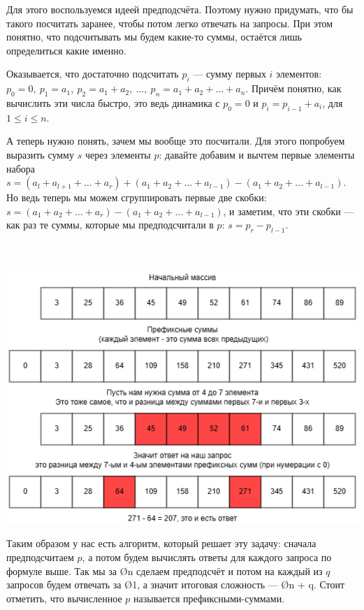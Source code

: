 Для этого воспользуемся идеей предподсчёта. Поэтому нужно придумать, что бы такого посчитать заранее, чтобы потом легко отвечать на запросы. При этом понятно, что подсчитывать мы будем какие-то суммы, остаётся лишь определиться какие именно.\\
\begin{minipage}[c]{0.40\linewidth}
    \setlength{\parindent}{1cm}
    \indent Оказывается, что достаточно подсчитать $p_i$ — сумму первых $i$ элементов: $p_0 = 0,\ p_1 = a_1,\ p_2 = a_1 + a_2,\ \ldots,\ p_n = a_1 + a_2 + \ldots + a_n$. Причём понятно, как вычислить эти числа быстро, это ведь динамика с $p_0 = 0$ и $p_i = p_{i - 1} + a_i$, для $1 \leq i \leq n$.
    
    А теперь нужно понять, зачем мы вообще это посчитали. Для этого попробуем выразить сумму $s$ через элементы $p$: давайте добавим и вычтем первые элементы набора $s = (a_l + a_{l + 1} + \ldots + a_{r}) + (a_1 + a_2 + \ldots + a_{l - 1}) - (a_1 + a_2 + \ldots + a_{l - 1})$. Но ведь теперь мы можем сгруппировать первые две скобки: $s = (a_1 + a_2 + \ldots + a_r) - (a_1 + a_2 + \ldots + a_{l - 1})$, и заметим, что эти скобки — как раз те суммы, которые мы предподсчитали в $p$: $s = p_r - p_{l - 1}$.
\end{minipage}
\begin{minipage}[c]{0.03\linewidth}\ \end{minipage}
\begin{minipage}[c]{0.57\linewidth}
    \includegraphics[scale=0.73]{img/prefix_sum.png}
\end{minipage}

Таким образом у нас есть алгоритм, который решает эту задачу: сначала предподсчитаем $p$, а потом будем вычислять ответы для каждого запроса по формуле выше. Так мы за \O{n} сделаем предподсчёт и потом на каждый из $q$ запросов будем отвечать за \O{1}, а значит итоговая сложность — \O{n + q}. Стоит отметить, что вычисленное $p$ называется префиксными-суммами.



